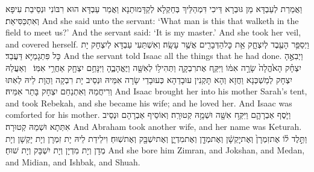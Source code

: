 {וַאֲמַרַת לְעַבְדָּא מַן גּוּבְרָא דֵּיכִי דִּמְהַלֵּיךְ בְּחַקְלָא לְקַדָּמוּתַנָא וַאֲמַר עַבְדָּא הוּא רִבּוֹנִי וּנְסֵיבַת עִיפָא וְאִתְכַּסִּיאַת׃}
{And she said unto the servant: ‘What man is this that walketh in the field to meet us?’ And the servant said: ‘It is my master.’ And she took her veil, and covered herself.}{}
{וַיְסַפֵּ֥ר הָעֶ֖בֶד לְיִצְחָ֑ק אֵ֥ת כׇּל\maqqaf הַדְּבָרִ֖ים אֲשֶׁ֥ר עָשָֽׂה׃}
{וְאִשְׁתַּעִי עַבְדָּא לְיִצְחָק יָת כָּל פִּתְגָמַיָּא דַּעֲבַד׃}
{And the servant told Isaac all the things that he had done.}{}
{וַיְבִאֶ֣הָ יִצְחָ֗ק הָאֹ֙הֱלָה֙ שָׂרָ֣ה אִמּ֔וֹ וַיִּקַּ֧ח אֶת\maqqaf רִבְקָ֛ה וַתְּהִי\maqqaf ל֥וֹ לְאִשָּׁ֖ה וַיֶּאֱהָבֶ֑הָ וַיִּנָּחֵ֥ם יִצְחָ֖ק אַחֲרֵ֥י אִמּֽוֹ׃ \petucha }
{וְאַעֲלַהּ יִצְחָק לְמַשְׁכְּנָא וַחֲזָא וְהָא תָּקְנִין עוּבָדַהָא כְּעוּבָדֵי שָׂרָה אִמֵּיהּ וּנְסֵיב יָת רִבְקָה וַהֲוָת לֵיהּ לְאִתּוּ וְרִיחֲמַהּ וְאִתְנַחַם יִצְחָק בָּתַר אִמֵּיהּ׃}
{And Isaac brought her into his mother Sarah’s tent, and took Rebekah, and she became his wife; and he loved her. And Isaac was comforted for his mother.}{}
\newperek
{}
{וַיֹּ֧סֶף אַבְרָהָ֛ם וַיִּקַּ֥ח אִשָּׁ֖ה וּשְׁמָ֥הּ קְטוּרָֽה׃}
{וְאוֹסֵיף אַבְרָהָם וּנְסֵיב אִתְּתָא וּשְׁמַהּ קְטוּרָה׃}
{And Abraham took another wife, and her name was Keturah.}{}
{וַתֵּ֣לֶד ל֗וֹ אֶת\maqqaf זִמְרָן֙ וְאֶת\maqqaf יׇקְשָׁ֔ן וְאֶת\maqqaf מְדָ֖ן וְאֶת\maqqaf מִדְיָ֑ן וְאֶת\maqqaf יִשְׁבָּ֖ק וְאֶת\maqqaf שֽׁוּחַ׃}
{וִילֵידַת לֵיהּ יָת זִמְרָן וְיָת יָקְשָׁן וְיָת מְדָן וְיָת מִדְיָן וְיָת יִשְׁבָּק וְיָת שׁוּחַ׃}
{And she bore him Zimran, and Jokshan, and Medan, and Midian, and Ishbak, and Shuah.}{}
